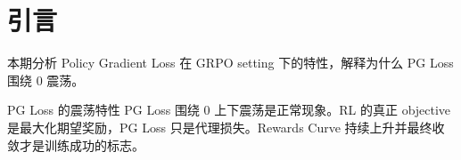 \section{引言}
本期分析 Policy Gradient Loss 在 GRPO setting 下的特性，解释为什么 PG Loss 围绕 0 震荡。

\begin{importantbox}{PG Loss 的震荡特性}
PG Loss 围绕 0 上下震荡是正常现象。RL 的真正 objective 是最大化期望奖励，PG Loss 只是代理损失。Rewards Curve 持续上升并最终收敛才是训练成功的标志。
\end{importantbox}

